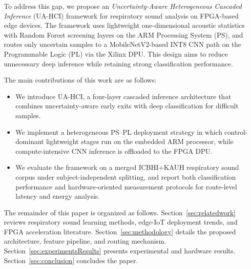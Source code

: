 

To address this gap, we propose an \textit{Uncertainty-Aware Heterogeneous Cascaded Inference} (UA-HCI) framework for respiratory sound analysis on FPGA-based edge devices. The framework uses lightweight one-dimensional acoustic statistics with Random Forest screening layers on the ARM Processing System (PS), and routes only uncertain samples to a MobileNetV2-based INT8 CNN path on the Programmable Logic (PL) via the Xilinx DPU. This design aims to reduce unnecessary deep inference while retaining strong classification performance.

The main contributions of this work are as follows:
\begin{itemize}
    \item We introduce UA-HCI, a four-layer cascaded inference architecture that combines uncertainty-aware early exits with deep classification for difficult samples.
    \item We implement a heterogeneous PS--PL deployment strategy in which control-dominant lightweight stages run on the embedded ARM processor, while compute-intensive CNN inference is offloaded to the FPGA DPU.
    \item We evaluate the framework on a merged ICBHI+KAUH respiratory sound corpus under subject-independent splitting, and report both classification performance and hardware-oriented measurement protocols for route-level latency and energy analysis.
\end{itemize}

The remainder of this paper is organized as follows. Section~\ref{sec:relatedwork} reviews respiratory sound learning methods, edge-IoT deployment trends, and FPGA acceleration literature. Section~\ref{sec:methodology} details the proposed architecture, feature pipeline, and routing mechanism. Section~\ref{sec:experimentsResults} presents experimental and hardware results. Section~\ref{sec:conclusion} concludes the paper.